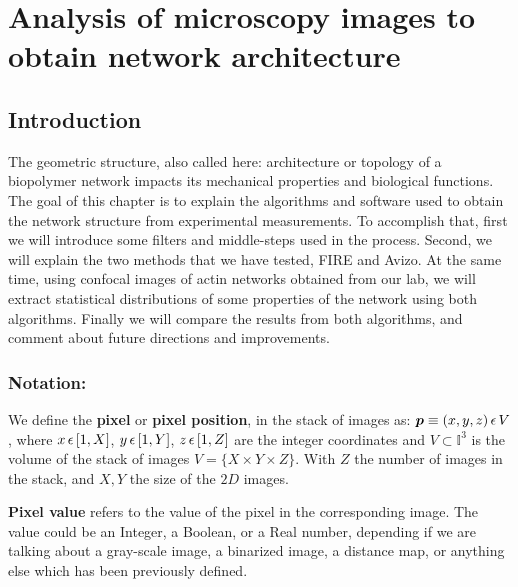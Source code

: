 
\chapter{Analysis of microscopy images to obtain network architecture} %

\label{Chapter-Image} %


\section{Introduction}
The geometric structure, also called here: architecture or topology of a
biopolymer network impacts its mechanical properties and biological functions.
The goal of this chapter is to explain the algorithms and software used to
obtain the network structure from experimental measurements. To accomplish that,
first we will introduce some filters and middle-steps used in the process. Second, we will explain the two
methods that we have tested, FIRE and Avizo. At the same time, using confocal
images of actin networks obtained from our lab,  we will extract statistical
distributions of some properties of the network using both algorithms. Finally
we will compare the results from both algorithms, and comment about future
directions and improvements.

\subsection{Notation:}


 We define the \textbf{pixel} or \textbf{pixel position}, in the stack of images as:
 $\boldsymbol{p}\equiv(x,y,z)\, \epsilon \,V$, where
 $x\,\epsilon \,{}[1,X]$, $y\,\epsilon \,{}[1,Y]$, $z\,\epsilon \,{}[1,Z]$ are the integer coordinates and
 $V\subset \mathbb{I}^3$ is the volume of the stack of images $V=\{X\times
 Y\times Z\}$.
 With $Z$ the number of images in the stack, and $X,Y$ the size of the $2D$ images.
 
 \textbf{Pixel value} refers to the value of the pixel in the corresponding
 image.
 The value could be an Integer, a Boolean, or a Real number, depending if we are
 talking about a gray-scale image, a binarized image, a distance map,
 or anything else which has been previously defined.

